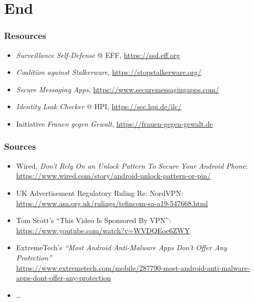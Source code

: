 \documentclass[aspectratio=169,dvipsnames]{beamer}
\newcommand{\backupbegin}{
   \newcounter{finalframe}
   \setcounter{finalframe}{\value{framenumber}}
}
\newcommand{\backupend}{
   \setcounter{framenumber}{\value{finalframe}}
}
\begin{document}
\appendix
\backupbegin

\section{End}

\begin{frame}
\frametitle{Resources}

\begin{itemize}
\item \emph{Surveillance Self-Defense} @ EFF, \url{https://ssd.eff.org}
\item \emph{Coalition against Stalkerware}, \url{https://stopstalkerware.org/}
\item \emph{Secure Messaging Apps}, \url{https://www.securemessagingapps.com/}
\item \emph{Identity Leak Checker} @ HPI, \url{https://sec.hpi.de/ilc/}
\item Initiative \emph{Frauen gegen Gewalt}, \url{https://frauen-gegen-gewalt.de}
\end{itemize}

\end{frame}

\begin{frame}
\frametitle{Sources}
\footnotesize

\begin{itemize}
\item Wired, \emph{Don't Rely On an Unlock Pattern To Secure Your Android Phone}: \\
\url{https://www.wired.com/story/android-unlock-pattern-or-pin/}
\item UK Advertisement Regulatory Ruling Re: NordVPN:\\
\url{https://www.asa.org.uk/rulings/tefincom-sa-a19-547668.html}
\item Tom Scott's ``This Video Is Sponsored By VPN'':\\
\url{https://www.youtube.com/watch?v=WVDQEoe6ZWY}
\item ExtremeTech's \emph{``Most Android Anti-Malware Apps Don’t Offer Any Protection''}\\
\url{https://www.extremetech.com/mobile/287790-most-android-anti-malware-apps-dont-offer-any-protection}
\item\dots
\end{itemize}

\end{frame}

\backupend
\end{document}
